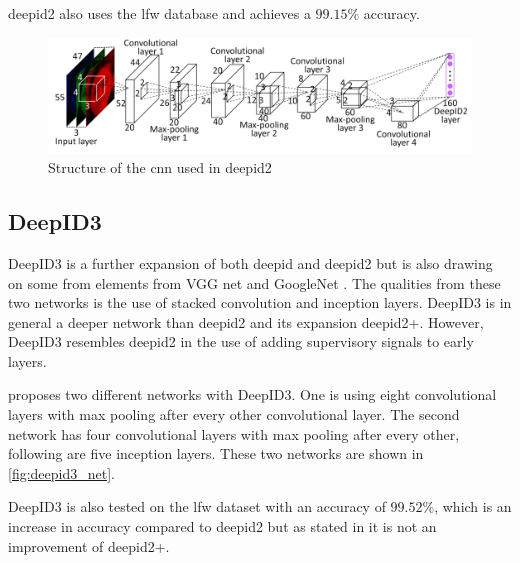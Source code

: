 \gls{deepid2} also uses the \gls{lfw} database and achieves a $99.15\%$ accuracy.

\begin{figure}[h]
	\centering
	\includegraphics[width=\textwidth]{figures/deepid2_convnet}
	\caption{Structure of the \gls{cnn} used in \gls{deepid2} \citep{sun2014}}
	\label{fig:deepid2_convnet}
\end{figure}

\subsection{DeepID3}
DeepID3 is a further expansion of both \gls{deepid} and \gls{deepid2} but is also drawing on some from elements from VGG net and GoogleNet \citep{sun2015}. The qualities from these two networks is the use of stacked convolution and inception layers. DeepID3 is in general a deeper network than \gls{deepid2} and its expansion \gls{deepid2}+. However, DeepID3 resembles \gls{deepid2} in the use of adding supervisory signals to early layers.

\cite{sun2015} proposes two different networks with DeepID3. One is using eight convolutional layers with max pooling after every other convolutional layer. The second network has four convolutional layers with max pooling after every other, following are five inception layers. These two networks are shown in \autoref{fig:deepid3_net}.

DeepID3 is also tested on the \gls{lfw} dataset with an accuracy of $99.52\%$, which is an increase in accuracy compared to \gls{deepid2} but as stated in \cite{sun2015} it is not an improvement of \gls{deepid2}+.

